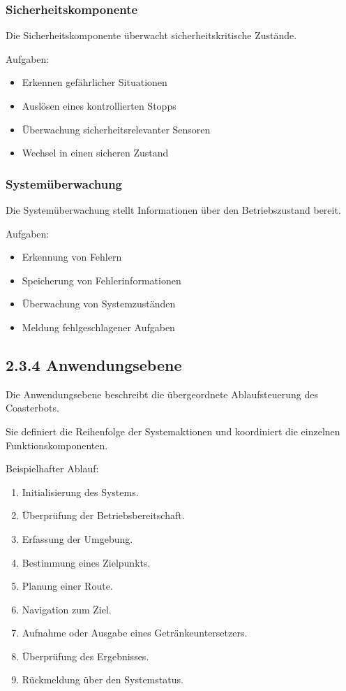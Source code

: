 \documentclass[
]{article}
\providecommand{\tightlist}{%
  \setlength{\itemsep}{0pt}\setlength{\parskip}{0pt}}
\begin{document}
\subsubsection{Sicherheitskomponente}\label{sicherheitskomponente}

Die Sicherheitskomponente überwacht sicherheitskritische Zustände.

Aufgaben:

\begin{itemize}
\tightlist
\item
  Erkennen gefährlicher Situationen
\item
  Auslösen eines kontrollierten Stopps
\item
  Überwachung sicherheitsrelevanter Sensoren
\item
  Wechsel in einen sicheren Zustand
\end{itemize}

\subsubsection{Systemüberwachung}\label{systemuxfcberwachung}

Die Systemüberwachung stellt Informationen über den Betriebszustand
bereit.

Aufgaben:

\begin{itemize}
\tightlist
\item
  Erkennung von Fehlern
\item
  Speicherung von Fehlerinformationen
\item
  Überwachung von Systemzuständen
\item
  Meldung fehlgeschlagener Aufgaben
\end{itemize}

\subsection{2.3.4 Anwendungsebene}\label{anwendungsebene}

Die Anwendungsebene beschreibt die übergeordnete Ablaufsteuerung des
Coasterbots.

Sie definiert die Reihenfolge der Systemaktionen und koordiniert die
einzelnen Funktionskomponenten.

Beispielhafter Ablauf:

\begin{enumerate}
\def\labelenumi{\arabic{enumi}.}
\tightlist
\item
  Initialisierung des Systems.
\item
  Überprüfung der Betriebsbereitschaft.
\item
  Erfassung der Umgebung.
\item
  Bestimmung eines Zielpunkts.
\item
  Planung einer Route.
\item
  Navigation zum Ziel.
\item
  Aufnahme oder Ausgabe eines Getränkeuntersetzers.
\item
  Überprüfung des Ergebnisses.
\item
  Rückmeldung über den Systemstatus.
\end{enumerate}
\end{document}
